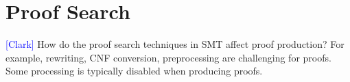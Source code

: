 \documentclass{llncs}
\newcommand{\Note}[1]{\textcolor{blue}{[#1]}}
\begin{document}




\section{Proof Search}

\Note{Clark}
How do the proof search techniques in SMT affect proof production?  For
example, rewriting, CNF conversion, preprocessing are challenging for proofs.
Some processing is typically disabled when producing proofs.








\end{document}
